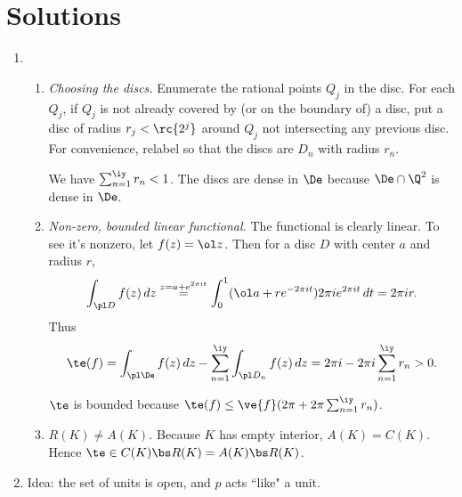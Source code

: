 \section{Solutions}
\begin{enumerate}
\item %

\begin{enumerate}
\item
{\it Choosing the discs.} Enumerate the rational points $Q_j$ in the disc. For each $Q_j$, if $Q_j$ is not already covered  by (or on the boundary of) a disc, put a disc of radius $r_j<\rc{2^j}$ around $Q_j$ not intersecting any previous disc. For convenience, relabel so that the discs are $D_n$ with radius $r_n$.

We have $\sum_{n=1}^{\iy} r_n<1$. The discs are dense in $\De$ because $\De\cap \Q^2$ is dense in $\De$.
\item
{\it Non-zero, bounded linear functional.} The functional is clearly linear. To see it's nonzero, let $f(z)=\ol z$. Then for a disc $D$ with center $a$ and radius $r$,
\[
\int_{\pl D} f(z)\,dz\stackrel{z=a+e^{2\pi it}}{=}\int_{0}^1(\ol a+re^{-2\pi i t})2\pi ie^{2\pi i t}\,dt=2\pi i r.
\]
Thus
\[
\te(f)=\int_{\pl \De}f(z)\,dz-\sum_{n=1}^{\iy} \int_{\pl D_n} f(z)\,dz=2\pi i - 2\pi i\sum_{n=1}^{\iy} r_n>0.
\]

$\te$ is bounded because $\te(f)\le \ve{f}(2\pi + 2\pi \sum_{n=1}^{\iy}r_n)$.
\item
{\it $R(K)\ne A(K)$.} Because $K$ has empty interior, $A(K)=C(K)$. Hence $\te\in C(K)\bs R(K)=A(K)\bs R(K)$.
 
\end{enumerate}

\item
Idea: the set of units is open, and $p$ acts ``like" a unit.


\end{enumerate}
